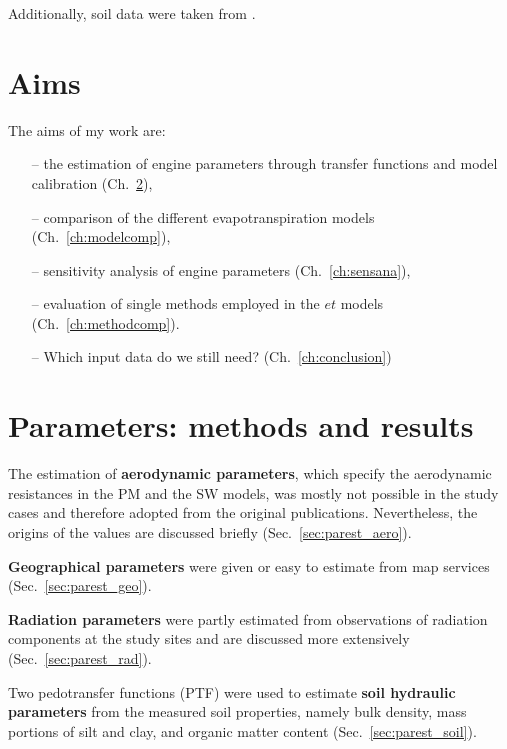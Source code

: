 \documentclass{scrreprt}
\begin{document}
Additionally, soil data were taken from \citet{mroos14}.


\chapter{Aims} \label{ch:aims}

The aims of my work are:
\begin{itemize}
  \item[--] the estimation of engine parameters through transfer functions and model calibration (Ch.~\ref{ch:parest}),
  \item[--] comparison of the different evapotranspiration models (Ch.~\ref{ch:modelcomp}),
  \item[--] sensitivity analysis of engine parameters (Ch.~\ref{ch:sensana}),
  \item[--] evaluation of single methods employed in the $et$ models (Ch.~\ref{ch:methodcomp}).
  \item[--] Which input data do we still need? (Ch.~\ref{ch:conclusion})
\end{itemize}


\chapter{Parameters: methods and results} \label{ch:parest}

The estimation of \textbf{aerodynamic parameters}, which specify the aerodynamic resistances in the PM and the SW models, was mostly not possible in the study cases and therefore adopted from the original publications.
Nevertheless, the origins of the values are discussed briefly (Sec.~\ref{sec:parest_aero}).

\textbf{Geographical parameters} were given or easy to estimate from map services (Sec.~\ref{sec:parest_geo}).

\textbf{Radiation parameters} were partly estimated from observations of radiation components at the study sites and are discussed more extensively (Sec.~\ref{sec:parest_rad}).

Two pedotransfer functions (PTF) were used to estimate \textbf{soil hydraulic parameters} from the measured soil properties, namely bulk density, mass portions of silt and clay, and organic matter content (Sec.~\ref{sec:parest_soil}).
\end{document}
